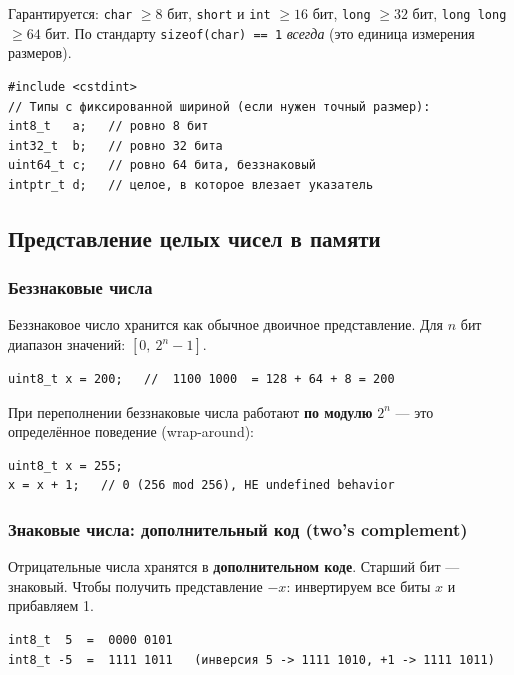 Гарантируется: \texttt{char} $\ge 8$ бит, \texttt{short} и \texttt{int} $\ge 16$ бит,
\texttt{long} $\ge 32$ бит, \texttt{long long} $\ge 64$ бит. По стандарту
\texttt{sizeof(char) == 1} \textit{всегда} (это единица измерения размеров).

\begin{lstlisting}
#include <cstdint>
// Типы с фиксированной шириной (если нужен точный размер):
int8_t   a;   // ровно 8 бит
int32_t  b;   // ровно 32 бита
uint64_t c;   // ровно 64 бита, беззнаковый
intptr_t d;   // целое, в которое влезает указатель
\end{lstlisting}

\subsection{Представление целых чисел в памяти}

\subsubsection{Беззнаковые числа}

Беззнаковое число хранится как обычное двоичное представление. Для $n$ бит
диапазон значений: $[0,\ 2^n - 1]$.

\begin{lstlisting}[numbers=none]
uint8_t x = 200;   //  1100 1000  = 128 + 64 + 8 = 200
\end{lstlisting}

При переполнении беззнаковые числа работают \textbf{по модулю} $2^n$ — это
определённое поведение (wrap-around):

\begin{lstlisting}
uint8_t x = 255;
x = x + 1;   // 0 (256 mod 256), НЕ undefined behavior
\end{lstlisting}

\subsubsection{Знаковые числа: дополнительный код (two's complement)}

Отрицательные числа хранятся в \textbf{дополнительном коде}. Старший бит ---
знаковый. Чтобы получить представление $-x$: инвертируем все биты $x$ и
прибавляем 1.

\begin{lstlisting}[numbers=none]
int8_t  5  =  0000 0101
int8_t -5  =  1111 1011   (инверсия 5 -> 1111 1010, +1 -> 1111 1011)
\end{lstlisting}

